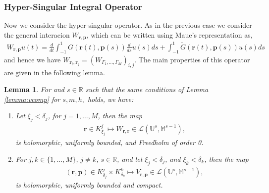 \documentclass{article}
\newtheorem{lemma}[theorem]{Lemma}
\newcommand{\IM}{{\mathbb M}}
\newcommand{\IR}{{\mathbb R}}
\newcommand{\IU}{{\mathbb U}}
\newcommand{\bp}{{\bm p}}
\newcommand{\br}{\bm{r}}
\begin{document}
\subsubsection{Hyper-Singular Integral Operator}

Now we consider the hyper-singular operator. As in the previous case we consider the general interacion $W_{\br,\bp}$, which can be written using Maue's representation as, 
\begin{align*}
W_{\br,\bp} u (t)= \frac{d}{dt}
 \int_{-1}^1 G(\br(t),\bp(s))\frac{d}{ds}u(s) ds + \int_{-1}^1\widetilde{G}(\br(t),\bp(s))u(s)ds
 \end{align*}
and hence we have $W_{\br_i,\br_j} = (W_{\Gamma_1,\hdots,\Gamma_M})_{i,j}$. The main properties of this operator are given in the following lemma. 

\begin{lemma}
\label{lemma:wcomp}
For and $s\in \IR$ such that the same conditions of Lemma \ref{lemma:vcomp} for $s,m,h,$ holds, we have:
\begin{enumerate}
\item 
Let $\xi_j< \delta_j$, for $j =1,\hdots,M$, then the map
\begin{align*}
\br \in K^j_{\xi_j} \mapsto W_{\br,\br} \in 
\mathcal{L}(\IU^s, \IM^{s-1}), 
\end{align*} 
is holomorphic, uniformly bounded, and Freedholm of order 0. 
\item 
For $j,k \in \{1,\hdots,M\}$, $j \neq k$, $s \in \IR$, and let $\xi_j < \delta_j$, and $\xi_k  < \delta_k$, then the map 
\begin{align*}
  (\br,\bp) \in K^j_{\delta_j} \times K^k_{\delta_k} \mapsto V_{\br,\bp} \in 
\mathcal{L}(\IU^s, \IM^{s-1}),
\end{align*}
is holomorphic, uniformly bounded and compact. 
\end{enumerate}
\end{lemma}
\end{document}
